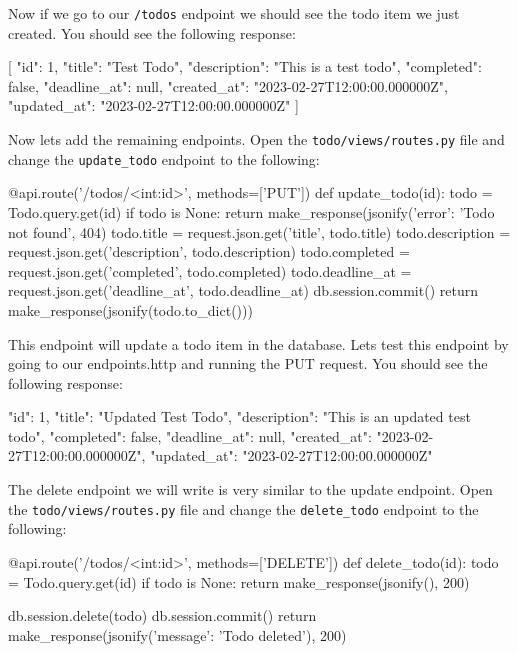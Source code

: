 \documentclass{csse4400}
\begin{document}
Now if we go to our \texttt{/todos} endpoint we should see the todo item we just created. You should see the following response:

\begin{code}[language=json,numbers=none]{}
  [
    {
      "id": 1,
      "title": "Test Todo",
      "description": "This is a test todo",
      "completed": false,
      "deadline_at": null,
      "created_at": "2023-02-27T12:00:00.000000Z",
      "updated_at": "2023-02-27T12:00:00.000000Z"
    }
  ]
\end{code}

Now lets add the remaining endpoints. Open the \texttt{todo/views/routes.py} file and change the \texttt{update\_todo} endpoint to the following:

\begin{code}[language=python,numbers=none]{}
  @api.route('/todos/<int:id>', methods=['PUT'])
  def update_todo(id):
      todo = Todo.query.get(id)
      if todo is None:
          return make_response(jsonify({'error': 'Todo not found'}, 404)
      todo.title = request.json.get('title', todo.title)
      todo.description = request.json.get('description', todo.description)
      todo.completed = request.json.get('completed', todo.completed)
      todo.deadline_at = request.json.get('deadline_at', todo.deadline_at)
      db.session.commit()
      return make_response(jsonify(todo.to_dict()))

\end{code}

This endpoint will update a todo item in the database. Lets test this endpoint by going to our endpoints.http and running the PUT request. You should see the following response:

\begin{code}[language=json,numbers=none]{}
  {
    "id": 1,
    "title": "Updated Test Todo",
    "description": "This is an updated test todo",
    "completed": false,
    "deadline_at": null,
    "created_at": "2023-02-27T12:00:00.000000Z",
    "updated_at": "2023-02-27T12:00:00.000000Z"
  }

\end{code}

The delete endpoint we will write is very similar to the update endpoint. Open the \texttt{todo/views/routes.py} file and change the \texttt{delete\_todo} endpoint to the following:

\begin{code}[language=python,numbers=none]{}
  @api.route('/todos/<int:id>', methods=['DELETE'])
  def delete_todo(id):
      todo = Todo.query.get(id)
      if todo is None:
          return make_response(jsonify(), 200)

      db.session.delete(todo)
      db.session.commit()
      return make_response(jsonify({'message': 'Todo deleted'}), 200)

\end{code}
\end{document}
